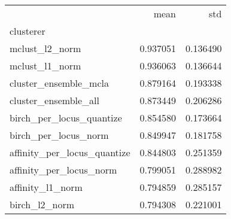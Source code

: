 \begin{tabular}{lrr}
\toprule
{} &      mean &       std \\
clusterer                   &           &           \\
\midrule
mclust\_l2\_norm              &  0.937051 &  0.136490 \\
mclust\_l1\_norm              &  0.936063 &  0.136644 \\
cluster\_ensemble\_mcla       &  0.879164 &  0.193338 \\
cluster\_ensemble\_all        &  0.873449 &  0.206286 \\
birch\_per\_locus\_quantize    &  0.854580 &  0.173664 \\
birch\_per\_locus\_norm        &  0.849947 &  0.181758 \\
affinity\_per\_locus\_quantize &  0.844803 &  0.251359 \\
affinity\_per\_locus\_norm     &  0.799051 &  0.288982 \\
affinity\_l1\_norm            &  0.794859 &  0.285157 \\
birch\_l2\_norm               &  0.794308 &  0.221001 \\
\bottomrule
\end{tabular}

